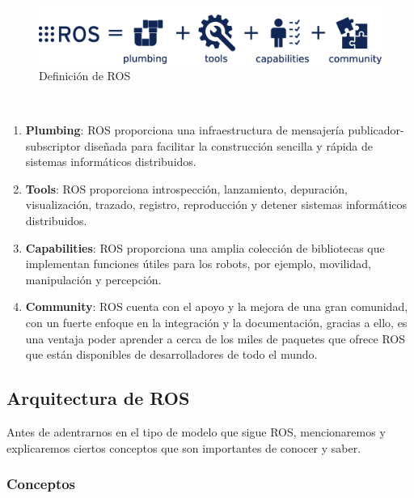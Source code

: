 \begin{figure} [H]
    \begin{center}
      \includegraphics[scale=0.18]{figs/Plataformas_Desarollo/ros-equation.png}
    \end{center}
    \caption{Definición de ROS}
    \label{fig:ROS}
  \end{figure}\


\begin{enumerate}
    \item \textbf{Plumbing}: ROS proporciona una infraestructura de mensajería publicador-subscriptor diseñada para facilitar la construcción sencilla y rápida de sistemas informáticos
    distribuidos.
    \item \textbf{Tools}: ROS proporciona introspección, lanzamiento, depuración, visualización, trazado, registro, reproducción y detener sistemas informáticos distribuidos.
    \item \textbf{Capabilities}: ROS proporciona una amplia colección de bibliotecas que implementan funciones útiles para los robots, por ejemplo, movilidad, manipulación y percepción.
    \item \textbf{Community}: ROS cuenta con el apoyo y la mejora de una gran comunidad, con un fuerte enfoque en la integración y la documentación, gracias a ello, es una ventaja poder
    aprender a cerca de los miles de paquetes que ofrece ROS que están disponibles de desarrolladores de todo el mundo.
\end{enumerate}

\subsection{Arquitectura de ROS}
\label{sec:arquitectura}
Antes de adentrarnos en el tipo de modelo que sigue ROS, mencionaremos y explicaremos ciertos conceptos que son importantes de conocer y saber.

\subsubsection{Conceptos}
\label{sec:conceptos}

